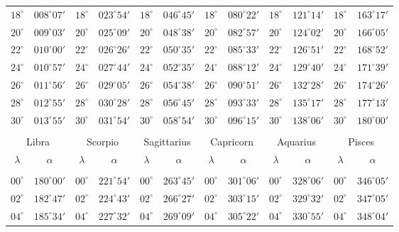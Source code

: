 \begin{table}[!h]
{\begin{tabular}{cc|cc|cc|cc|cc|cc}
$18^\circ$ & $008^\circ07'$ & $18^\circ$ & $023^\circ54'$ & $18^\circ$ & $046^\circ45'$ & $18^\circ$ & $080^\circ22'$ & $18^\circ$ & $121^\circ14'$ & $18^\circ$ & $163^\circ17'$\\
$20^\circ$ & $009^\circ03'$ & $20^\circ$ & $025^\circ09'$ & $20^\circ$ & $048^\circ38'$ & $20^\circ$ & $082^\circ57'$ & $20^\circ$ & $124^\circ02'$ & $20^\circ$ & $166^\circ05'$\\
$22^\circ$ & $010^\circ00'$ & $22^\circ$ & $026^\circ26'$ & $22^\circ$ & $050^\circ35'$ & $22^\circ$ & $085^\circ33'$ & $22^\circ$ & $126^\circ51'$ & $22^\circ$ & $168^\circ52'$\\
$24^\circ$ & $010^\circ57'$ & $24^\circ$ & $027^\circ44'$ & $24^\circ$ & $052^\circ35'$ & $24^\circ$ & $088^\circ12'$ & $24^\circ$ & $129^\circ40'$ & $24^\circ$ & $171^\circ39'$\\
$26^\circ$ & $011^\circ56'$ & $26^\circ$ & $029^\circ05'$ & $26^\circ$ & $054^\circ38'$ & $26^\circ$ & $090^\circ51'$ & $26^\circ$ & $132^\circ28'$ & $26^\circ$ & $174^\circ26'$\\
$28^\circ$ & $012^\circ55'$ & $28^\circ$ & $030^\circ28'$ & $28^\circ$ & $056^\circ45'$ & $28^\circ$ & $093^\circ33'$ & $28^\circ$ & $135^\circ17'$ & $28^\circ$ & $177^\circ13'$\\
$30^\circ$ & $013^\circ55'$ & $30^\circ$ & $031^\circ54'$ & $30^\circ$ & $058^\circ54'$ & $30^\circ$ & $096^\circ15'$ & $30^\circ$ & $138^\circ06'$ & $30^\circ$ & $180^\circ00'$\\
\multicolumn{12}{c}{}\\
\multicolumn{2}{c}{Libra}\vline & \multicolumn{2}{c}{Scorpio} \vline& \multicolumn{2}{c}{Sagittarius} \vline& \multicolumn{2}{c}{Capricorn}\vline &
\multicolumn{2}{c}{Aquarius}\vline & \multicolumn{2}{c}{Pisces}\\\hline
$\lambda$& $\alpha$& $\lambda$& $\alpha$& $\lambda$& $\alpha$& $\lambda$& $\alpha$& $\lambda$& $\alpha$& $\lambda$& $\alpha$\\\hline
&&&&&&&&&&&\\[-2ex]
$00^\circ$ & $180^\circ00'$ & $00^\circ$ & $221^\circ54'$ & $00^\circ$ & $263^\circ45'$ & $00^\circ$ & $301^\circ06'$ &  $00^\circ$ & $328^\circ06'$ & $00^\circ$ & $346^\circ05'$\\
$02^\circ$ & $182^\circ47'$ & $02^\circ$ & $224^\circ43'$ & $02^\circ$ & $266^\circ27'$ & $02^\circ$ & $303^\circ15'$ &  $02^\circ$ & $329^\circ32'$ & $02^\circ$ & $347^\circ05'$\\
$04^\circ$ & $185^\circ34'$ & $04^\circ$ & $227^\circ32'$ & $04^\circ$ & $269^\circ09'$ & $04^\circ$ & $305^\circ22'$ &  $04^\circ$ & $330^\circ55'$ & $04^\circ$ & $348^\circ04'$\\

\end{tabular}}
\end{table}
